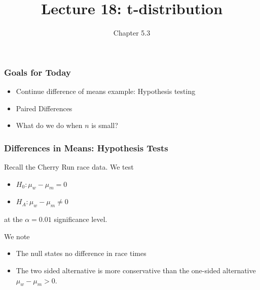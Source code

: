 \documentclass[slides]{beamer}
\title{Lecture 18: t-distribution}
\author{Chapter 5.3}
\date{}
\newcommand{\blue}[1]{\textcolor{blue2}{#1}}
\begin{document}
\begin{frame}
\titlepage
\end{frame}








\begin{frame}[fragile]
\frametitle{Goals for Today}

\begin{itemize}
\item Continue difference of means example:  Hypothesis testing
\item Paired Differences
\item What do we do when $n$ is small?  
\end{itemize}


\end{frame}



\begin{frame}[fragile]
\frametitle{Differences in Means:  Hypothesis Tests}
Recall the Cherry Run race data.  We test
\begin{itemize}
\item $H_0: \mu_w - \mu_m = 0$
\item $H_A: \mu_w - \mu_m \neq 0$
\end{itemize}
at the $\alpha=0.01$ significance level.

\vspace{0.5cm}

\pause We note
\begin{itemize}
\item The null states no difference in race times
\pause \item The two sided alternative is more \blue{conservative} than the one-sided alternative $\mu_w - \mu_m > 0$.
\end{itemize}
\end{frame}
\end{document}
